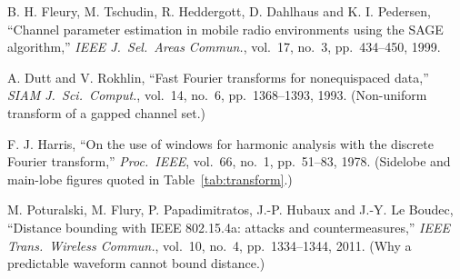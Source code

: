 \documentclass[11pt,a4paper]{article}
\begin{document}
\begin{enumerate}[label={[\arabic*]},leftmargin=2.2em,itemsep=3pt]
\item B. H. Fleury, M. Tschudin, R. Heddergott, D. Dahlhaus and K. I. Pedersen, ``Channel parameter
  estimation in mobile radio environments using the SAGE algorithm,'' \emph{IEEE J.\ Sel.\ Areas
  Commun.}, vol.\ 17, no.\ 3, pp.\ 434--450, 1999.

\item A. Dutt and V. Rokhlin, ``Fast Fourier transforms for nonequispaced data,'' \emph{SIAM J.\ Sci.\
  Comput.}, vol.\ 14, no.\ 6, pp.\ 1368--1393, 1993. (Non-uniform transform of a gapped channel set.)

\item F. J. Harris, ``On the use of windows for harmonic analysis with the discrete Fourier
  transform,'' \emph{Proc.\ IEEE}, vol.\ 66, no.\ 1, pp.\ 51--83, 1978. (Sidelobe and main-lobe
  figures quoted in Table~\ref{tab:transform}.)

\item M. Poturalski, M. Flury, P. Papadimitratos, J.-P. Hubaux and J.-Y. Le Boudec, ``Distance
  bounding with IEEE 802.15.4a: attacks and countermeasures,'' \emph{IEEE Trans.\ Wireless
  Commun.}, vol.\ 10, no.\ 4, pp.\ 1334--1344, 2011. (Why a predictable waveform cannot bound
  distance.)
\end{enumerate}
\end{document}
